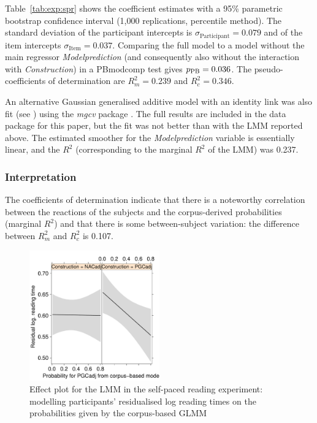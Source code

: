 Table~\ref{tab:exp:spr} shows the coefficient estimates with a 95\% parametric bootstrap confidence interval (1,000 replications, percentile method).
The standard deviation of the participant intercepts is $\sigma_{\text{Participant}}=0.079$ and of the item intercepts $\sigma_{\text{Item}}=0.037$.
Comparing the full model to a model without the main regressor \textit{Modelprediction} (and consequently also without the interaction with \textit{Construction}) in a PBmodcomp test gives $p_{\text{PB}}=0.036$.
The pseudo-coefficients of determination are $R^2_m=0.239$ and $R^2_c=0.346$.

An alternative Gaussian generalised additive model with an identity link was also fit (see \citealp{DivjakEa2016}) using the \textit{mgcv} package \citep{Wood2011}.
The full results are included in the data package for this paper, but the fit was not better than with the LMM reported above.
The estimated smoother for the \textit{Modelprediction} variable is essentially linear, and the $R^2$ (corresponding to the marginal $R^2$ of the LMM) was 0.237.

\subsubsection{Interpretation}

The coefficients of determination indicate that there is a noteworthy correlation between the reactions of the subjects and the corpus-derived probabilities (marginal $R^2$) and that there is some between-subject variation: the difference between $R^2_m$ and $R^2_c$ is 0.107.

\begin{figure}[htbp!]
\centering
\includegraphics[width=0.5\textwidth]{../R/output/spr_effects}
\caption{Effect plot for the LMM in the self-paced reading experiment: modelling participants' residualised log reading times on the probabilities given by the corpus-based GLMM}
\label{fig:spr:effects}
\end{figure}

